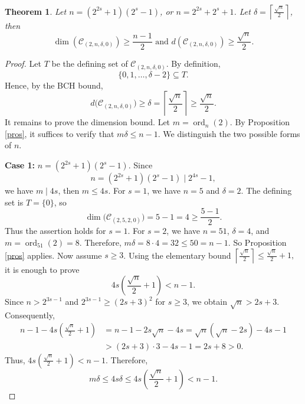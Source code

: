 \documentclass[12pt,draftcls,journal,onecolumn]{IEEEtran}
\newtheorem{theorem}{Theorem}
\begin{document}
\begin{theorem}\label{eq:thmee}
Let $n=(2^{2s}+1)(2^s-1)$, or $n=2^{2s}+2^s+1$. Let $\delta=\left\lceil\frac{\sqrt n}{2}\right\rceil$,
then \[
\dim (\mathcal C_{(2,n,\delta,0)})\ge \frac{n-1}{2}
\,\,\text{and}\,\,
d(\mathcal C_{(2,n,\delta,0)})\ge \frac{\sqrt n}{2}.
\]
\end{theorem}
\begin{proof}
Let \(T\) be the defining set of \(\mathcal C_{(2,n,\delta,0)}\). By definition,
\[
\{0,1,\dots,\delta-2\}\subseteq T.
\]
Hence, by the BCH bound,
\[
d\bigl(\mathcal C_{(2,n,\delta,0)}\bigr)\ge \delta
=\left\lceil \frac{\sqrt n}{2}\right\rceil
\ge \frac{\sqrt n}{2}.
\]
It remains to prove the dimension bound.
Let \(m=\operatorname{ord}_n(2)\). By Proposition \ref{pros}, it suffices to verify that
$
m\delta\le n-1.
$
We distinguish the two possible forms of \(n\).


\noindent
\textbf{Case 1:} \(n=(2^{2s}+1)(2^s-1)\).
Since
\[
n=(2^{2s}+1)(2^s-1)\mid 2^{4s}-1,
\]
we have \(m\mid 4s\), then \(m\le 4s\).
For \(s=1\), we have \(n=5\) and \(\delta=2\). The defining set is \(T=\{0\}\), so
\[
\dim\bigl(\mathcal C_{(2,5,2,0)}\bigr)=5-1=4\ge \frac{5-1}{2}.
\]
Thus the assertion holds for \(s=1\).
For \(s=2\), we have \(n=51\), \(\delta=4\), and \(m=\operatorname{ord}_{51}(2)=8\). Therefore,
$
m\delta=8\cdot 4=32\le 50=n-1.
$
So Proposition \ref{pros} applies.
Now assume \(s\ge 3\). Using the elementary bound
$
\left\lceil \frac{\sqrt n}{2}\right\rceil\le \frac{\sqrt n}{2}+1,
$
it is enough to prove
\[
4s\left(\frac{\sqrt n}{2}+1\right)<n-1.
\]
Since \(n>2^{3s-1}\) and \(2^{3s-1}\ge (2s+3)^2\) for \(s\ge 3\), we obtain
$
\sqrt n>2s+3.
$
Consequently,
\[
\begin{aligned}
n-1-4s\left(\frac{\sqrt n}{2}+1\right)
&=n-1-2s\sqrt n-4s=\sqrt n(\sqrt n-2s)-4s-1\\
&>(2s+3)\cdot 3-4s-1=2s+8>0.
\end{aligned}
\]
Thus,
$
4s\left(\frac{\sqrt n}{2}+1\right)<n-1.
$
Therefore,
$$
m\delta\le 4s\delta
\le 4s\left(\frac{\sqrt n}{2}+1\right)
<n-1.
$$





\end{proof}
\end{document}
